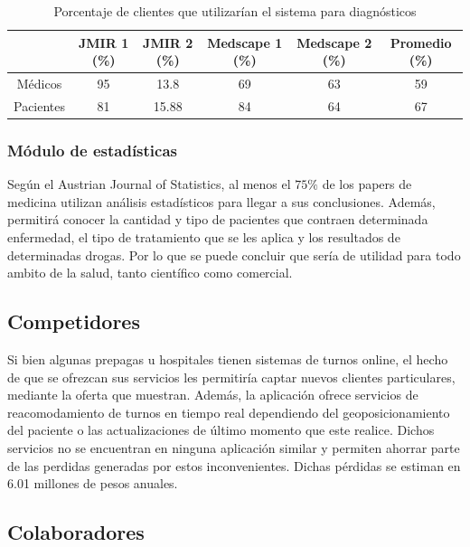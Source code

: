 \documentclass[a4paper,10pt]{article}
\begin{document}
\begin{table} [H]
\begin{center}
\begin{tabular}{|c|c|c|c|c|c|}
\hline
			&JMIR 1 (\%)	&JMIR 2 (\%)	&Medscape 1 (\%)	&Medscape 2 (\%)	&Promedio (\%)\\\hline
Médicos		&95							&13.8						&69							&63									&59\\\hline
Pacientes	&81							&15.88						&84							&64									&67\\\hline
\end{tabular}
\end{center}
\caption{Porcentaje de clientes que utilizarían el sistema para diagnósticos}
\end{table}

\subsubsection{Módulo de estadísticas}

Según el Austrian Journal of Statistics, al menos el $75\%$ de los 
papers de medicina utilizan análisis estadísticos para llegar a sus conclusiones. Además, permitirá conocer la cantidad y tipo de pacientes que contraen determinada enfermedad, el tipo de tratamiento que se les aplica y los resultados de determinadas drogas. Por lo que se puede concluir que sería de utilidad para todo ambito de la salud, tanto científico como comercial.

\subsection{Competidores}

Si bien algunas prepagas u hospitales tienen sistemas de turnos online, 
el hecho de que se ofrezcan sus servicios les permitiría captar nuevos clientes particulares, mediante la oferta que muestran. Además, la aplicación ofrece servicios de reacomodamiento de turnos en tiempo real dependiendo del geoposicionamiento del paciente o las actualizaciones de último momento que este realice. Dichos servicios no se encuentran en ninguna aplicación similar y permiten ahorrar parte de las perdidas generadas por estos inconvenientes. Dichas pérdidas se estiman en 
6.01 millones de pesos anuales.

\subsection{Colaboradores}
\end{document}

